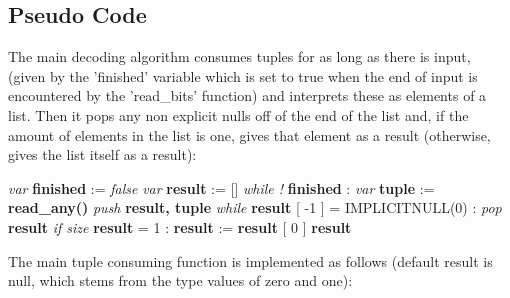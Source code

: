 \subsection{Pseudo Code}

The main decoding algorithm consumes tuples for as long as there is input,
(given by the 'finished' variable which is set to true when the end of input
is encountered by the 'read\_bits' function)
and interprets these as elements of a list.
Then it pops any non explicit nulls off of the end of the list and, if the amount of
elements in the list is one, gives that element as a result
(otherwise, gives the list itself as a result):

\begin{changemargin}{-60mm}{0mm}
\begin{myquote}

\vbox{
\textit{var} \textbf{finished} := \textit{false} \newline
\textit{var} \textbf{result} := [] \newline
\textit{while !} \textbf{finished} : \newline
\indent\hspace{.5cm} \textit{var} \textbf{tuple} := \textbf{read\_any()} \newline
\indent\hspace{.5cm} \textit{push} \textbf{result, tuple} \newline
\textit{while} \textbf{result} [ -1 ] = IMPLICITNULL(0) :\newline
\indent\hspace{.5cm} \textit{pop} \textbf{result} \newline
\textit{if size} \textbf{result} = 1 : \newline
\indent\hspace{.5cm} \textbf{result} := \textbf{result} [ 0 ] \newline
\textbf{result} \newline
}

\end{myquote}
\end{changemargin}

The main tuple consuming function is implemented as follows
(default result is null, which stems from the type values of zero and one):

